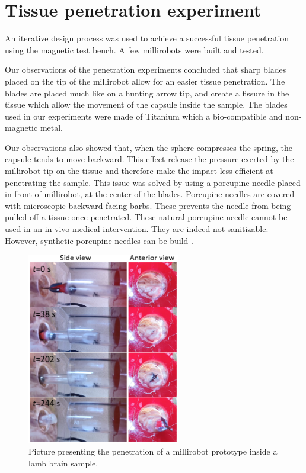 \documentclass[letterpaper, 10 pt, conference]{ieeeconf}  %
\begin{document}
\section{Tissue penetration experiment}

An iterative design process was used to achieve a successful tissue penetration using the magnetic test bench. A few millirobots were built and tested. \par
Our observations of the penetration experiments concluded that sharp blades placed on the tip of the millirobot allow for an easier tissue penetration. The blades are placed much like on a hunting arrow tip, and create a fissure in the tissue which allow the movement of the capsule inside the sample. The blades used in our experiments were made of Titanium which a bio-compatible and non-magnetic metal.\par
Our observations also showed that, when the sphere compresses the spring, the capsule tends to move backward. This effect release the pressure exerted by the millirobot tip on the tissue and therefore make the impact less efficient at penetrating the sample. This issue was solved by using a porcupine needle placed in front of millirobot, at the center of the blades. Porcupine needles are covered with microscopic backward facing barbs. These prevents the needle from being pulled off a tissue once penetrated. These natural porcupine needle cannot be used in an in-vivo medical intervention. They are indeed not sanitizable. However, synthetic porcupine needles can be build \cite{cho2012microstructured}.\par

\begin{figure}
	\centering
  \includegraphics[width=190pt]{brain_penetration.png}
  \caption{Picture presenting the penetration of a millirobot prototype inside a lamb brain sample.}
  \label{brain_penetration}
\end{figure}
\end{document}
